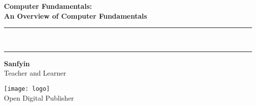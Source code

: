 
{}
{
\centering
\Huge\bfseries Computer Fundamentals:\\
 An Overview of Computer Fundamentals\\[-4mm]
\color{red}  
 \rule{\linewidth}{1pt}\\[-6mm]
 \rule{\linewidth}{2pt}
}


\vskip3cm
{\noindent \LARGE \bfseries  Sanfyin}\\[5mm]

\noindent Teacher and Learner

\vfill 
\texttt{[image: logo]}\\[1mm]
Open Digital Publisher

\clearpage